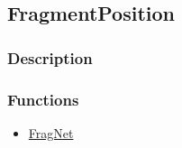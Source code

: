 \subsection{FragmentPosition}\label{FragmentPosition}
\subsubsection{Description}


\subsubsection{Functions}
\begin{itemize}
\item \hyperref[FragNet]{FragNet}
\end{itemize}


